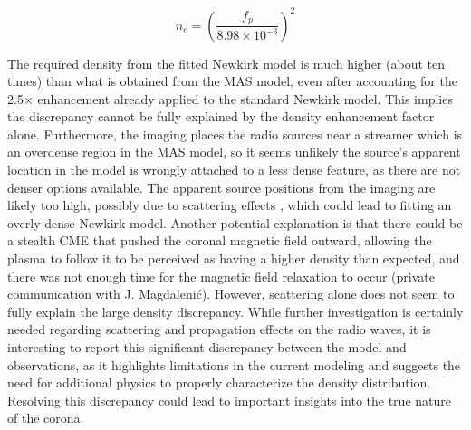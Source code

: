 \begin{equation}
    n_e = \left(\frac{f_p}{8.98 \times 10^{-3}}\right)^2
\label{plasma_freq}
\end{equation}

The required density from the fitted Newkirk model is much higher (about ten times) than what is obtained from the MAS model, even after accounting for the 2.5$\times$ enhancement already applied to the standard Newkirk model. This implies the discrepancy cannot be fully explained by the density enhancement factor alone. Furthermore, the imaging places the radio sources near a streamer which is an overdense region in the MAS model, so it seems unlikely the source's apparent location in the model is wrongly attached to a less dense feature, as there are not denser options available.
The apparent source positions from the imaging are likely too high, possibly due to scattering effects \citep{kontar_2019, kontar_2023, chen_2023}, which could lead to fitting an overly dense Newkirk model. Another potential explanation is that there could be a stealth CME that pushed the coronal magnetic field outward, allowing the plasma to follow it to be perceived as having a higher density than expected, and there was not enough time for the magnetic field relaxation to occur (private communication with J. Magdalenić). However, scattering alone does not seem to fully explain the large density discrepancy. While further investigation is certainly needed regarding scattering and propagation effects on the radio waves, it is interesting to report this significant discrepancy between the model and observations, as it highlights limitations in the current modeling and suggests the need for additional physics to properly characterize the density distribution. Resolving this discrepancy could lead to important insights into the true nature of the corona.

